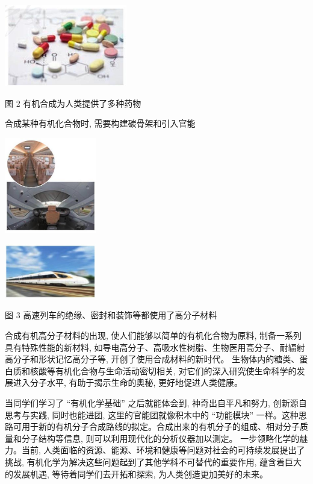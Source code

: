 \documentclass[10pt]{article}
\begin{document}
\begin{center}
\includegraphics[max width=0.4\textwidth]{images/0190efc5-b58a-7c43-bfb0-e0a030df9cfd_6_978264.jpg}
\end{center}

图 2 有机合成为人类提供了多种药物

合成某种有机化合物时, 需要构建碳骨架和引入官能

\begin{center}
\includegraphics[max width=0.3\textwidth]{images/0190efc5-b58a-7c43-bfb0-e0a030df9cfd_7_123078.jpg}
\end{center}

\begin{center}
\includegraphics[max width=0.3\textwidth]{images/0190efc5-b58a-7c43-bfb0-e0a030df9cfd_7_880218.jpg}
\end{center}

图 3 高速列车的绝缘、密封和装饰等都使用了高分子材料

合成有机高分子材料的出现, 使人们能够以简单的有机化合物为原料, 制备一系列具有特殊性能的新材料, 如导电高分子、高吸水性树脂、生物医用高分子、耐辐射高分子和形状记忆高分子等, 开创了使用合成材料的新时代。 生物体内的糖类、蛋白质和核酸等有机化合物与生命活动密切相关, 对它们的深入研究使生命科学的发展进入分子水平, 有助于揭示生命的奥秘, 更好地促进人类健康。

当同学们学习了 “有机化学基础” 之后就能体会到, 神奇出自平凡和努力, 创新源自思考与实践, 同时也能进团, 这里的官能团就像积木中的 “功能模块” 一样。这种思路可用于新的有机分子合成路线的拟定。合成出来的有机分子的组成、相对分子质量和分子结构等信息, 则可以利用现代化的分析仪器加以测定。 一步领略化学的魅力。当前, 人类面临的资源、能源、环境和健康等问题对社会的可持续发展提出了挑战, 有机化学为解决这些问题起到了其他学科不可替代的重要作用, 蕴含着巨大的发展机遇, 等待着同学们去开拓和探索, 为人类创造更加美好的未来。
\end{document}
